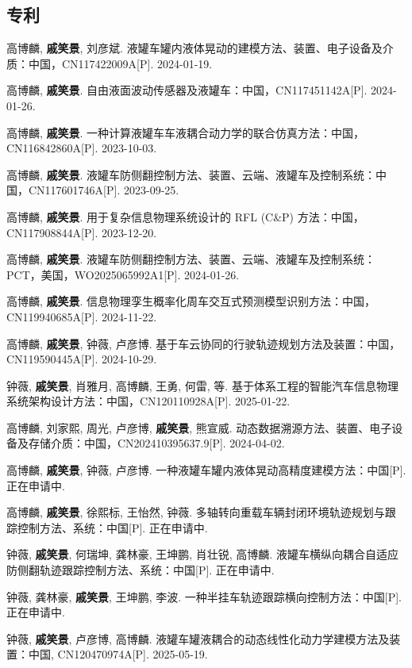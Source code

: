 \begin{resume}
  \subsection*{专利}

  \begin{achievements}
    \item 高博麟, \textbf{戚笑景}, 刘彦斌. 液罐车罐内液体晃动的建模方法、装置、电子设备及介质：中国，CN117422009A[P]. 2024-01-19.
    \item 高博麟, \textbf{戚笑景}. 自由液面波动传感器及液罐车：中国，CN117451142A[P]. 2024-01-26.
    \item 高博麟, \textbf{戚笑景}. 一种计算液罐车车液耦合动力学的联合仿真方法：中国，CN116842860A[P]. 2023-10-03.
    \item 高博麟, \textbf{戚笑景}. 液罐车防侧翻控制方法、装置、云端、液罐车及控制系统：中国，CN117601746A[P]. 2023-09-25.
    \item 高博麟, \textbf{戚笑景}. 用于复杂信息物理系统设计的 RFL (C\&P) 方法：中国，CN117908844A[P]. 2023-12-20.
    \item 高博麟, \textbf{戚笑景}. 液罐车防侧翻控制方法、装置、云端、液罐车及控制系统：PCT，美国，WO2025065992A1[P]. 2024-01-26.
    \item 高博麟, \textbf{戚笑景}. 信息物理孪生概率化周车交互式预测模型识别方法：中国，CN119940685A[P]. 2024-11-22.
    \item 高博麟, \textbf{戚笑景}, 钟薇, 卢彦博. 基于车云协同的行驶轨迹规划方法及装置：中国，CN119590445A[P]. 2024-10-29.
    \item 钟薇, \textbf{戚笑景}, 肖雅月, 高博麟, 王勇, 何雷, 等. 基于体系工程的智能汽车信息物理系统架构设计方法：中国，CN120110928A[P]. 2025-01-22.
    \item 高博麟, 刘家熙, 周光, 卢彦博, \textbf{戚笑景}, 熊宣威. 动态数据溯源方法、装置、电子设备及存储介质：中国，CN202410395637.9[P]. 2024-04-02.
    \item 高博麟, \textbf{戚笑景}, 钟薇, 卢彦博. 一种液罐车罐内液体晃动高精度建模方法：中国[P]. 正在申请中.
    \item 高博麟, \textbf{戚笑景}, 徐熙标, 王怡然, 钟薇. 多轴转向重载车辆封闭环境轨迹规划与跟踪控制方法、系统：中国[P]. 正在申请中.
    \item 钟薇, \textbf{戚笑景}, 何瑞坤, 龚林豪, 王坤鹏, 肖壮锐, 高博麟. 液罐车横纵向耦合自适应防侧翻轨迹跟踪控制方法、系统：中国[P]. 正在申请中.
    \item 钟薇, 龚林豪, \textbf{戚笑景}, 王坤鹏, 李波. 一种半挂车轨迹跟踪横向控制方法：中国[P]. 正在申请中.
    \item 钟薇, \textbf{戚笑景}, 卢彦博, 高博麟. 液罐车罐液耦合的动态线性化动力学建模方法及装置：中国, CN120470974A[P]. 2025-05-19.
  \end{achievements}



\end{resume}
